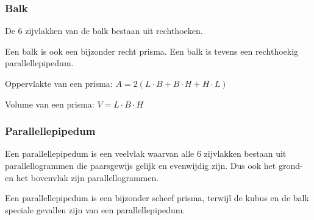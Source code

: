 \subsubsection{Balk}
\begin{definitie}
	De 6 zijvlakken van de balk bestaan uit rechthoeken. 
\end{definitie}

Een balk is ook een bijzonder recht prisma.
Een balk is tevens een rechthoekig parallellepipedum.




\begin{ftonthoud}
			
		Oppervlakte van een prisma: $A=2(L\cdot B+B\cdot H+H\cdot L)$
		
		Volume van een prisma: $V=L\cdot B\cdot H$

\end{ftonthoud}

\subsubsection{Parallellepipedum}
\begin{definitie}
	Een parallellepipedum is een veelvlak waarvan alle 6 zijvlakken bestaan uit parallellogrammen die paarsgewijs gelijk en evenwijdig zijn. Dus ook het grond- en het bovenvlak zijn parallellogrammen. 

\end{definitie}
Een parallellepipedum is een bijzonder scheef prisma, terwijl de kubus en de balk speciale gevallen zijn van een parallellepipedum.





